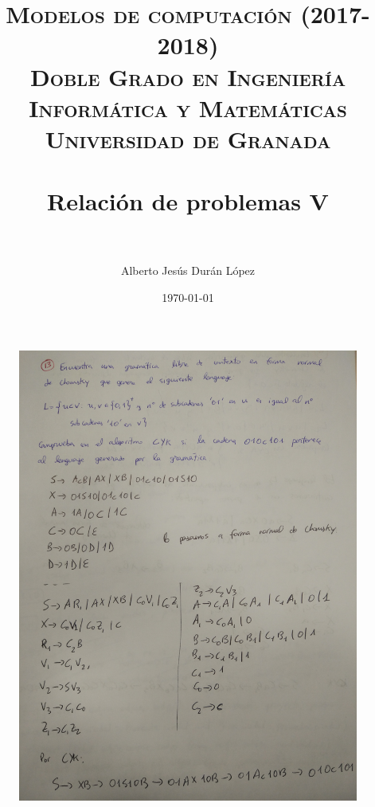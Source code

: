 


\title{	
	\normalfont \normalsize 
	\textsc{\textbf{Modelos de computación (2017-2018)} \\ Doble Grado en Ingeniería Informática y Matemáticas \\ Universidad de Granada} \\ [25pt] 
	\horrule{0.5pt} \\[0.4cm]
	\huge Relación de problemas V \\ 
	\horrule{2pt} \\[0.5cm] 
}

\author{Alberto Jesús Durán López} 
\date{\normalsize\today} %



	\maketitle       %
	\newpage 
	\newpage
	



\begin{figure}[h]
	\includegraphics[scale=0.14]{images/1.jpg}
\end{figure}



